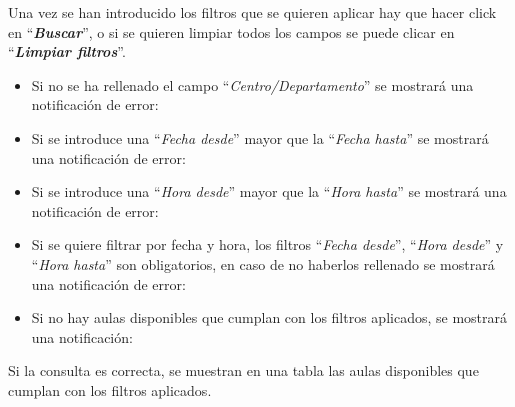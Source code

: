 
Una vez se han introducido los filtros que se quieren aplicar hay que hacer click en ``\textbf{\textit{Buscar}}'', o si se quieren limpiar todos los campos se puede clicar en ``\textbf{\textit{Limpiar filtros}}''.

\begin{itemize}
    \item Si no se ha rellenado el campo ``\textit{Centro/Departamento}'' se mostrará una notificación de error:
    
    
    \item Si se introduce una ``\textit{Fecha desde}'' mayor que la ``\textit{Fecha hasta}'' se mostrará una notificación de error:
    
    
    \item Si se introduce una ``\textit{Hora desde}'' mayor que la ``\textit{Hora hasta}'' se mostrará una notificación de error:
    
    
    \item Si se quiere filtrar por fecha y hora, los filtros ``\textit{Fecha desde}'', ``\textit{Hora desde}'' y ``\textit{Hora hasta}'' son obligatorios, en caso de no haberlos rellenado se mostrará una notificación de error:
    
    
    \item Si no hay aulas disponibles que cumplan con los filtros aplicados, se mostrará una notificación:
    
\end{itemize}

Si la consulta es correcta, se muestran en una tabla las aulas disponibles que cumplan con los filtros aplicados.

